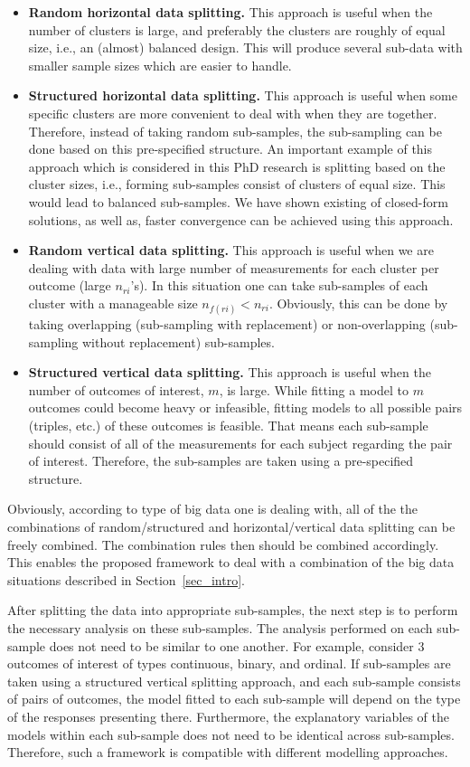 \documentclass[14pt]{article}
\begin{document}
\begin{itemize}
\item \textbf{Random horizontal data splitting.} This approach is useful when the number of clusters is large, and preferably the clusters are roughly of equal size, i.e., an (almost) balanced design. This will produce several sub-data with smaller sample sizes which are easier to handle.
\item \textbf{Structured horizontal data splitting.} This approach is useful when some specific clusters are more convenient to deal with when they are together. Therefore, instead of taking random sub-samples, the sub-sampling can be done based on this pre-specified structure. An important example of this approach which is considered in this PhD research is splitting based on the cluster sizes, i.e., forming sub-samples consist of clusters of equal size. This would lead to balanced sub-samples. We have shown existing of closed-form solutions, as well as, faster convergence can be achieved using this approach.
\item \textbf{Random vertical data splitting.} This approach is useful when we are dealing with data with large number of measurements for each cluster per outcome (large $n_{ri}$'s). In this situation one can take sub-samples of each cluster with a manageable size $n_{f(ri)} < n_{ri}$. Obviously, this can be done by taking overlapping (sub-sampling with replacement) or non-overlapping (sub-sampling without replacement) sub-samples.
\item \textbf{Structured vertical data splitting.} This approach is useful when the number of outcomes of interest, $m$, is large. While fitting a model to $m$ outcomes could become heavy or infeasible, fitting models to all possible pairs (triples, etc.) of these outcomes is feasible. That means each sub-sample should consist of all of the measurements for each subject regarding the pair of interest. Therefore, the sub-samples are taken using a pre-specified structure.
\end{itemize}
Obviously, according to type of big data one is dealing with, all of the the combinations of random/structured and horizontal/vertical data splitting can be freely combined. The combination rules then should be combined accordingly. This enables the proposed framework to deal with a combination of the big data situations described in Section~\ref{sec_intro}.


After splitting the data into appropriate sub-samples, the next step is to perform the necessary analysis on these sub-samples. The analysis performed on each sub-sample does not need to be similar to one another. For example, consider 3 outcomes of interest of types continuous, binary, and ordinal. If sub-samples are taken using a structured vertical splitting approach, and each sub-sample consists of pairs of outcomes, the model fitted to each sub-sample will depend on the type of the responses presenting there. Furthermore, the explanatory variables of the models within each sub-sample does not need to be identical across sub-samples. Therefore, such a framework is compatible with different modelling approaches.
\end{document}
